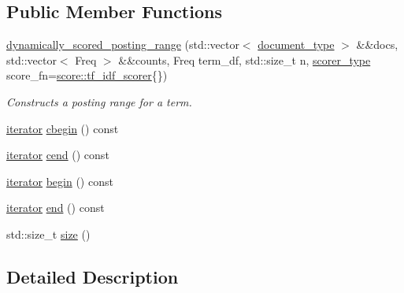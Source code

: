\subsection*{Public Member Functions}
\begin{DoxyCompactItemize}
\item 
\mbox{\hyperlink{classirk_1_1dynamically__scored__posting__range_a0bf84be64d0211e820667a067445c50b}{dynamically\+\_\+scored\+\_\+posting\+\_\+range}} (std\+::vector$<$ \mbox{\hyperlink{classirk_1_1dynamically__scored__posting__range_a30b30964cca4601be1eab249b12bd825}{document\+\_\+type}} $>$ \&\&docs, std\+::vector$<$ Freq $>$ \&\&counts, Freq term\+\_\+df, std\+::size\+\_\+t n, \mbox{\hyperlink{classirk_1_1dynamically__scored__posting__range_aa82b83ad2a96aeda0fff2cb233d877f9}{scorer\+\_\+type}} score\+\_\+fn=\mbox{\hyperlink{structirk_1_1score_1_1tf__idf__scorer}{score\+::tf\+\_\+idf\+\_\+scorer}}\{\})
\begin{DoxyCompactList}\small\item\em Constructs a posting range for a term. \end{DoxyCompactList}\item 
\mbox{\hyperlink{classirk_1_1dynamically__scored__posting__range_1_1iterator}{iterator}} \mbox{\hyperlink{classirk_1_1dynamically__scored__posting__range_ab21e42d5ffecd277777253dcb0a2d6f9}{cbegin}} () const
\item 
\mbox{\hyperlink{classirk_1_1dynamically__scored__posting__range_1_1iterator}{iterator}} \mbox{\hyperlink{classirk_1_1dynamically__scored__posting__range_ab6bc4bbfdf9ce645df81835b957de595}{cend}} () const
\item 
\mbox{\hyperlink{classirk_1_1dynamically__scored__posting__range_1_1iterator}{iterator}} \mbox{\hyperlink{classirk_1_1dynamically__scored__posting__range_a984ac75ae00f56ec53c2676e57259aa6}{begin}} () const
\item 
\mbox{\hyperlink{classirk_1_1dynamically__scored__posting__range_1_1iterator}{iterator}} \mbox{\hyperlink{classirk_1_1dynamically__scored__posting__range_a9d5aba54aba865a979c414603ad4ebe4}{end}} () const
\item 
std\+::size\+\_\+t \mbox{\hyperlink{classirk_1_1dynamically__scored__posting__range_ac6024a8e41e31068811e2942f9f751ad}{size}} ()
\end{DoxyCompactItemize}


\subsection{Detailed Description}
